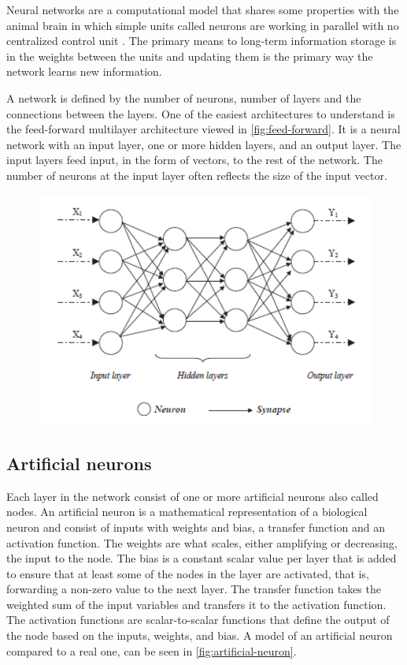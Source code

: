 Neural networks are a computational model that shares some properties with the animal brain in which simple units called neurons are working in parallel with no centralized control unit \cite{Patterson2017}. The primary means to long-term information storage is in the weights between the units and updating them is the primary way the network learns new information.

A network is defined by the number of neurons, number of layers and the connections between the layers. One of the easiest architectures to understand is the feed-forward multilayer architecture viewed in \autoref{fig:feed-forward}. It is a neural network with an input layer, one or more hidden layers, and an output layer. The input layers feed input, in the form of vectors, to the rest of the network. The number of neurons at the input layer often reflects the size of the input vector.

\begin{figure}[H]
    \centering
    \includegraphics[width=0.8\linewidth]{fig/feedforward-neural-network.png}
    \label{fig:feed-forward}
\end{figure}

\subsection{Artificial neurons}
Each layer in the network consist of one or more artificial neurons also called nodes. An artificial neuron is a mathematical representation of a biological neuron and consist of inputs with weights and bias, a transfer function and an activation function. The weights are what scales, either amplifying or decreasing, the input to the node. The bias is a constant scalar value per layer that is added to ensure that at least some of the nodes in the layer are activated, that is, forwarding a non-zero value to the next layer. The transfer function takes the weighted sum of the input variables and transfers it to the activation function. The activation functions are scalar-to-scalar functions that define the output of the node based on the inputs, weights, and bias. A model of an artificial neuron compared to a real one, can be seen in \autoref{fig:artificial-neuron}. 


